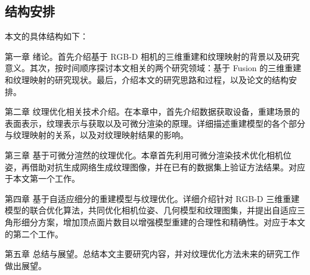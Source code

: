 \subsection{结构安排}


本文的具体结构如下： \par
第一章 绪论。首先介绍基于 RGB-D 相机的三维重建和纹理映射的背景以及研究意义。其次，按时间顺序探讨本文相关的两个研究领域：基于 Fusion 的三维重建和纹理映射的研究现状。最后，介绍本文的研究思路和过程，以及论文的结构安排。\par
第二章 纹理优化相关技术介绍。在本章中，首先介绍数据获取设备，重建场景的表面表示，纹理表示与获取以及可微分渲染的原理。详细描述重建模型的各个部分与纹理映射的关系，以及对纹理映射结果的影响。\par
第三章 基于可微分渲然的纹理优化。本章首先利用可微分渲染技术优化相机位姿，再借助对抗生成网络生成纹理图像，并在已有的数据集上验证方法结果。对应于本文第一个工作。\par
第四章 基于自适应细分的重建模型与纹理优化。详细介绍针对 RGB-D 三维重建模型的联合优化算法，共同优化相机位姿、几何模型和纹理图集，并提出自适应三角形细分方案，增加顶点面片数目以增强模型重建的合理性和精确性。对应于本文的第二个工作。\par
第五章 总结与展望。总结本文主要研究内容，并对纹理优化方法未来的研究工作做出展望。

